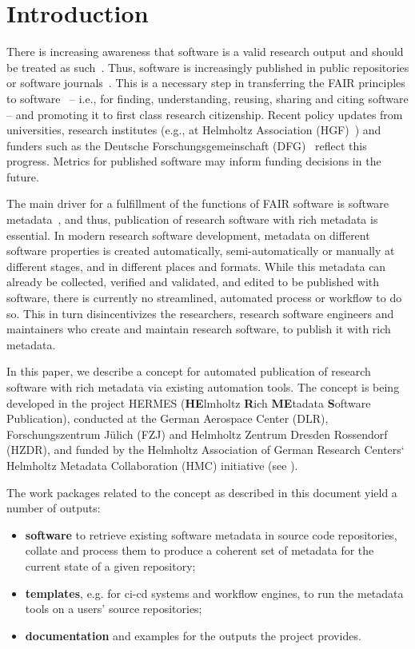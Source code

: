 \documentclass[11pt,a4paper]{scrartcl}
\begin{document}
\section{Introduction}\label{sec:introduction}
There is increasing awareness that software is a valid research output and should be treated as such~\cite{jaySoftwareMustBe2021,SoftCitePrinciples}. Thus, software is increasingly published in public repositories or software journals~\cite{TrackingCitations}. This is a necessary step in transferring the FAIR principles to software~\cite{FAIR4RS-Principles} -- i.e., for finding, understanding, reusing, sharing and citing software -- and promoting it to first class research citizenship. Recent policy updates from universities, research institutes (e.g., at Helmholtz Association (HGF)~\cite{HelmholtzSWPolicy}) and funders such as the Deutsche Forschungsgemeinschaft (DFG)~\cite{DFG-GRP19} reflect this progress. Metrics for published software may inform funding decisions in the future.

The main driver for a fulfillment of the functions of FAIR software is software metadata~\cite{FAIR4RS-FreshLook}, and thus, publication of research software with rich metadata is essential. In modern research software development, metadata on different software properties is created automatically, semi-automatically or manually at different stages, and in different places and formats. While this metadata can already be collected, verified and validated, and edited to be published with software, there is currently no streamlined, automated process or workflow to do so. This in turn disincentivizes the researchers, research software engineers and maintainers who create and maintain research software, to publish it with rich metadata.

In this paper, we describe a concept for automated publication of research software with rich metadata via existing automation tools. The concept is being developed in the project HERMES (\textbf{HE}lmholtz \textbf{R}ich \textbf{ME}tadata \textbf{S}oftware Publication), conducted at the German Aerospace Center (DLR), Forschungszentrum Jülich (FZJ) and Helmholtz Zentrum Dresden Rossendorf (HZDR), and funded by the Helmholtz Association of German Research Centers‘ Helmholtz Metadata Collaboration (HMC) initiative (see ).

The work packages related to the concept as described in this document yield a number of outputs: 

\begin{itemize}
  \item \textbf{software} to retrieve existing software metadata in source code repositories, collate and process them to produce a coherent set of metadata for the current state of a given repository;
  \item \textbf{templates}, e.g. for \gls{ci-cd} systems and workflow engines, to run the metadata tools on a users' source repositories;
  \item \textbf{documentation} and examples for the outputs the project provides.
\end{itemize}
\end{document}
